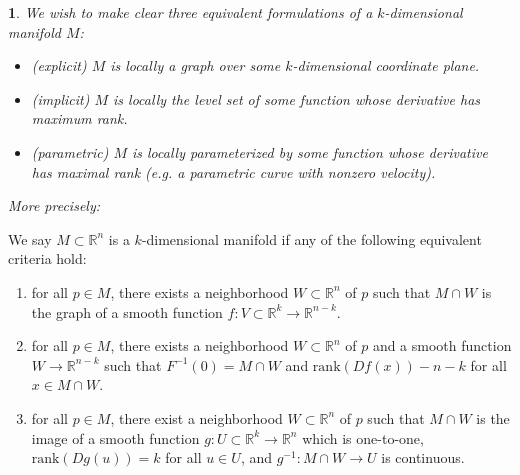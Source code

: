 \documentclass[12pt]{article}
\newtheorem{para}[theorem]{}
\begin{document}
\begin{para} 
	We wish to make clear three equivalent formulations of a $k$-dimensional manifold $M$:
	\begin{itemize}
		\item (explicit) $M$ is locally a graph over some $k$-dimensional coordinate plane.
		\item (implicit) $M$ is locally the level set of some function whose derivative has maximum rank.
		\item (parametric) $M$ is locally parameterized by some function whose derivative has maximal rank (e.g. a parametric curve with nonzero velocity).
	\end{itemize}
	More precisely:
\end{para}	

\begin{definition}
	We say $M\subset\mathbb{R}^n$ is a $k$-dimensional manifold if any of the following equivalent criteria hold:
	\begin{enumerate}
		\item for all $p\in M$, there exists a neighborhood $W\subset\mathbb{R}^n$ of $p$ such that $M\cap W$ is the graph of a smooth function $f:V\subset\mathbb{R}^k\to\mathbb{R}^{n-k}$.
		\item for all $p\in M$, there exists a neighborhood $W\subset\mathbb{R}^n$ of $p$ and a smooth function $W\to\mathbb{R}^{n-k}$ such that $F^{-1}(0)=M\cap W$ and $\text{rank}(Df(x))-n-k$ for all $x\in M\cap W$.
		\item for all $p\in M$, there exist a neighborhood $W\subset\mathbb{R}^n$ of $p$ such that $M\cap W$ is the image of a smooth function $g:U\subset\mathbb{R}^k\to\mathbb{R}^n$ which is one-to-one, $\text{rank}(Dg(u))=k$ for all $u\in U$, and $g^{-1}:M\cap W\to U$ is continuous.
	\end{enumerate}
\end{definition}
\end{document}
